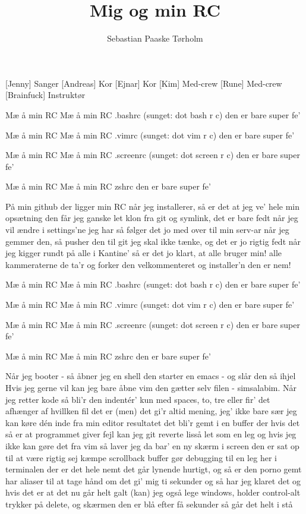 \documentclass[a4paper,11pt]{article}
\title{Mig og min RC}
\author{Sebastian Paaske Tørholm}
\begin{document}
\maketitle

\begin{roles}
[Jenny] Sanger
[Andreas] Kor
[Ejnar] Kor
[Kim] Med-crew
[Rune] Med-crew
[Brainfuck] Instruktør
\end{roles}

\begin{sketch}
\end{sketch}

\begin{song}
%
Mæ å min RC
Mæ å min RC
.bashrc (sunget: dot bash r c)
den er bare super fe'

Mæ å min RC
Mæ å min RC
.vimrc (sunget: dot vim r c)
den er bare super fe'

Mæ å min RC
Mæ å min RC
.screenrc (sunget: dot screen r c)
den er bare super fe'

Mæ å min RC
Mæ å min RC
zshrc
den er bare super fe'

På min github der ligger min RC
når jeg installerer, så er det at jeg ve'
hele min opsætning den får jeg ganske let
klon fra git og symlink, det er bare fedt
når jeg vil ændre i settings'ne jeg har
så følger det jo med over til min serv-ar
når jeg gemmer den, så pusher den til git
jeg skal ikke tænke, og det er jo rigtig fedt
når jeg kigger rundt på alle i Kantine'
så er det jo klart, at alle bruger min!
alle kammeraterne de ta'r og forker den
velkommenteret og installer'n den er nem!

Mæ å min RC
Mæ å min RC
.bashrc (sunget: dot bash r c)
den er bare super fe'

Mæ å min RC
Mæ å min RC
.vimrc (sunget: dot vim r c)
den er bare super fe'

Mæ å min RC
Mæ å min RC
.screenrc (sunget: dot screen r c)
den er bare super fe'

Mæ å min RC
Mæ å min RC
zshrc
den er bare super fe'

Når jeg booter - så åbner jeg en shell
den starter en emacs - og slår den så ihjel
Hvis jeg gerne vil kan jeg bare åbne vim
den gætter selv filen - simsalabim.
Når jeg retter kode så bli'r den indentér'
kun med spaces, to, tre eller fir'
det afhænger af hvillken fil det er
(men) det gi'r altid mening, jeg' ikke bare sær
jeg kan køre dén inde fra min editor
resultatet det bli'r gemt i en buffer der
hvis det så er at programmet giver fejl
kan jeg git reverte lisså let som en leg
og hvis jeg ikke kan gøre det fra vim
så laver jeg da bar' en ny skærm i screen
den er sat op til at være rigtig sej
kæmpe scrollback buffer gør debugging til en leg
her i terminalen der er det hele nemt
det går lynende hurtigt, og så er den porno gemt
har aliaser til at tage hånd om det
gi' mig ti sekunder og så har jeg klaret det
og hvis det er at det nu går helt galt
(kan) jeg også lege windows, holder control-alt
trykker på delete, og skærmen den er blå
efter få sekunder så går det helt i stå


\end{song}
\end{document}
